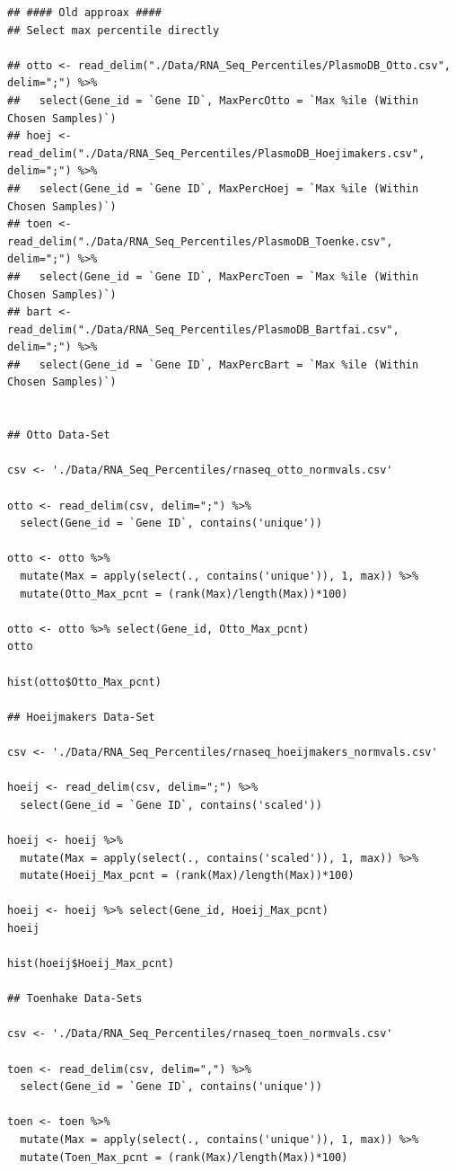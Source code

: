\documentclass[11pt]{article}
\begin{document}
\begin{verbatim}
## #### Old approax ####
## Select max percentile directly

## otto <- read_delim("./Data/RNA_Seq_Percentiles/PlasmoDB_Otto.csv", delim=";") %>%
##   select(Gene_id = `Gene ID`, MaxPercOtto = `Max %ile (Within Chosen Samples)`)
## hoej <- read_delim("./Data/RNA_Seq_Percentiles/PlasmoDB_Hoejimakers.csv", delim=";") %>%
##   select(Gene_id = `Gene ID`, MaxPercHoej = `Max %ile (Within Chosen Samples)`)
## toen <- read_delim("./Data/RNA_Seq_Percentiles/PlasmoDB_Toenke.csv", delim=";") %>%
##   select(Gene_id = `Gene ID`, MaxPercToen = `Max %ile (Within Chosen Samples)`)
## bart <- read_delim("./Data/RNA_Seq_Percentiles/PlasmoDB_Bartfai.csv", delim=";") %>%
##   select(Gene_id = `Gene ID`, MaxPercBart = `Max %ile (Within Chosen Samples)`)


## Otto Data-Set

csv <- './Data/RNA_Seq_Percentiles/rnaseq_otto_normvals.csv'

otto <- read_delim(csv, delim=";") %>%
  select(Gene_id = `Gene ID`, contains('unique'))

otto <- otto %>%
  mutate(Max = apply(select(., contains('unique')), 1, max)) %>%
  mutate(Otto_Max_pcnt = (rank(Max)/length(Max))*100)

otto <- otto %>% select(Gene_id, Otto_Max_pcnt)
otto

hist(otto$Otto_Max_pcnt)

## Hoeijmakers Data-Set

csv <- './Data/RNA_Seq_Percentiles/rnaseq_hoeijmakers_normvals.csv'

hoeij <- read_delim(csv, delim=";") %>%
  select(Gene_id = `Gene ID`, contains('scaled'))

hoeij <- hoeij %>%
  mutate(Max = apply(select(., contains('scaled')), 1, max)) %>%
  mutate(Hoeij_Max_pcnt = (rank(Max)/length(Max))*100)

hoeij <- hoeij %>% select(Gene_id, Hoeij_Max_pcnt)
hoeij

hist(hoeij$Hoeij_Max_pcnt)

## Toenhake Data-Sets

csv <- './Data/RNA_Seq_Percentiles/rnaseq_toen_normvals.csv'

toen <- read_delim(csv, delim=",") %>%
  select(Gene_id = `Gene ID`, contains('unique'))

toen <- toen %>%
  mutate(Max = apply(select(., contains('unique')), 1, max)) %>%
  mutate(Toen_Max_pcnt = (rank(Max)/length(Max))*100)


\end{verbatim}
\end{document}
